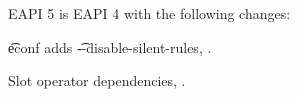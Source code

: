EAPI 5 is EAPI 4 with the following changes:

\begin{compactitem}
\item \t{econf} adds \t{-{}-disable-silent-rules}, .
\item Slot operator dependencies, .
\end{compactitem}



